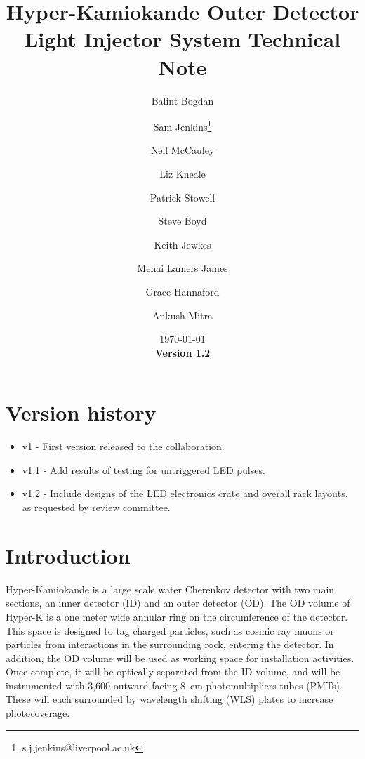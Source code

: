 \documentclass[a4paper,11pt]{article}
\begin{document}
\title{Hyper-Kamiokande Outer Detector Light Injector System Technical Note}
\author[1]{Balint Bogdan}
\author[1]{Sam Jenkins\footnote{s.j.jenkins@liverpool.ac.uk}}
\author[1]{Neil McCauley}
\author[2]{Liz Kneale}
\author[2]{Patrick Stowell}
\author[3]{Steve Boyd}
\author[3]{Keith Jewkes}
\author[3]{Menai Lamers James}
\author[3]{Grace Hannaford}
\author[3]{Ankush Mitra}

\date{\today\\
{\bf Version 1.2}}

\maketitle

\tableofcontents

\newpage

\section{Version history}
\begin{itemize}
\item v1 - First version released to the collaboration.
\item v1.1 - Add results of testing for untriggered LED pulses.
\item v1.2 - Include designs of the LED electronics crate and overall rack layouts, as requested by review committee.
\end{itemize}

\newpage

\section{Introduction}
\label{sec:intro}

Hyper-Kamiokande is a large scale water Cherenkov detector with two main sections, an inner detector (ID) and an outer detector (OD). The OD volume of Hyper-K is a one meter wide annular ring on the circumference of the detector. This space is designed to tag charged particles, such as cosmic ray muons or particles from interactions in the surrounding rock, entering the detector. In addition, the OD volume will be used as working space for installation activities. Once complete, it will be optically separated from the ID volume, and will be instrumented with 3,600 outward facing 8~cm photomultipliers tubes (PMTs). These will each surrounded by wavelength shifting (WLS) plates to increase photocoverage.
\end{document}
